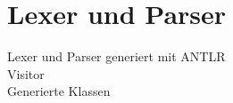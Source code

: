 \chapter{Lexer und Parser}





Lexer und Parser generiert mit ANTLR\\
Visitor\\
Generierte Klassen\\